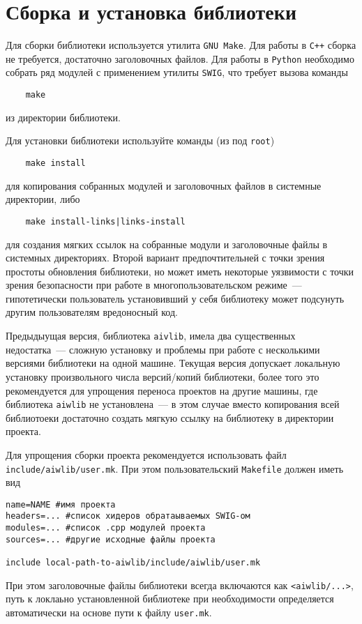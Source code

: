 \section{Сборка и установка библиотеки}
Для сборки библиотеки используется утилита \verb'GNU Make'. Для работы в \verb'C++' сборка не требуется,
достаточно заголовочных файлов. Для работы в \verb'Python' необходимо собрать
ряд модулей с применением утилиты \verb'SWIG', что требует вызова команды 
\begin{verbatim}
    make
\end{verbatim}
из директории библиотеки.

Для установки библиотеки используйте команды (из под \verb'root')
\begin{verbatim}
    make install
\end{verbatim}
для копирования собранных модулей и заголовочных файлов в системные директории, либо
\begin{verbatim}
    make install-links|links-install
\end{verbatim}
для создания мягких ссылок на собранные модули и заголовочные файлы в системных директориях.
Второй вариант предпочтительней с точки зрения простоты обновления библиотеки, 
но может иметь некоторые уязвимости с точки зрения безопасности
при работе в многопользовательском режиме~--- 
гипотетически пользователь установивший у себя библиотеку может подсунуть другим пользователям вредоносный код.

Предыдыущая версия, библиотека {\tt aivlib}, имела два существенных недостатка~--- сложную установку и проблемы при
работе с несколькими версиями библиотеки на одной машине. Текущая версия допускает локальную установку
произвольного числа версий/копий библиотеки, более того это рекомендуется для  
упрощения переноса проектов на другие машины, где библиотека \verb'aiwlib' не установлена~---
в этом случае вместо копирования всей библиотоеки достаточно создать мягкую ссылку на библиотеку в директории проекта.

Для упрощения сборки проекта рекомендуется использовать файл \verb'include/aiwlib/user.mk'.
При этом пользовательский \verb'Makefile' должен иметь вид
\begin{verbatim}
name=NAME #имя проекта
headers=... #список хидеров обратаываемых SWIG-ом
modules=... #список .cpp модулей проекта
sources=... #другие исходные файлы проекта

include local-path-to-aiwlib/include/aiwlib/user.mk
\end{verbatim}
При этом заголовочные файлы библиотеки всегда включаются как \verb'<aiwlib/...>',
путь к локлаьно установленной библиотеке при необходимости определяется автоматически на основе пути к файлу \verb'user.mk'.

